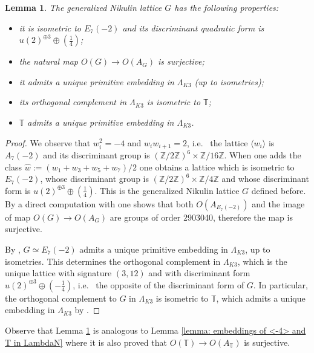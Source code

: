 \documentclass{amsart}
\newtheorem{lem}[thm]{Lemma}
\theoremstyle{definition}
\numberwithin{equation}{section}
\numberwithin{equation}{section} \theoremstyle{definition}
\newcommand{\ra}{\rightarrow}
\newcommand\Z{\mathbb{Z}}
\begin{document}
\begin{lem}\label{lemma: properties of G}
The generalized Nikulin lattice $G$ has the following properties: 
\begin{itemize}
\item it is isometric to $E_7(-2)$ and its discriminant quadratic form is $u(2)^{\oplus 3}\oplus \left(\frac{1}{4}\right)$;
\item the natural map $O(G)\ra O(A_G)$ is surjective; 
\item  it admits a unique primitive embedding in $\Lambda_{K3}$ (up to isometries); \item its orthogonal complement in $\Lambda_{K3}$ is isometric to $\mathbb{T}$;
\item $\mathbb{T}$ admits a unique primitive embedding in $\Lambda_{K3}$.
\end{itemize}
\end{lem}
\begin{proof}
We observe that $w_i^2=-4$ and $w_{i}w_{i+1}=2$, i.e.~ the lattice $\langle w_i\rangle$ is $A_7(-2)$ and its discriminant group is $(\Z/2\Z)^6\times \Z/16\Z$. When one adds the class $\hat{w}:=(w_1+w_3+w_5+w_7)/2$ one obtains a lattice which is isometric to $E_7(-2)$, whose discriminant group is $(\Z/2\Z)^6\times \Z/4\Z$ and whose discriminant form is $u(2)^{\oplus 3}\oplus (\frac{1}{4})$. This is the generalized Nikulin lattice $G$ defined before. By a direct computation with \cite{oscar} one shows that both $O(A_{E_7(-2)})$ and the image of map $O(G)\ra O(A_G)$ are groups of order 2903040, therefore the map is surjective.

By \cite[Theorem 1.14.4]{N}, $G\simeq E_7(-2)$ admits a unique primitive embedding in $\Lambda_{K3}$, up to isometries. This determines the orthogonal complement in $\Lambda_{K3}$, which is the unique lattice with signature $(3,12)$ and with discriminant form  $u(2)^{\oplus 3}\oplus (-\frac{1}{4})$, i.e.~ the opposite of the discriminant form of $G$. In particular, the orthogonal complement to $G$ in $\Lambda_{K3}$ is isometric to $\mathbb{T}$, which admits a unique embedding in $\Lambda_{K3}$ by \cite[Theorem 1.14.4]{N}.
\end{proof}
Observe that Lemma \ref{lemma: properties of G} is analogous to Lemma \ref{lemma: embeddings of <-4> and T in LambdaN} where it is also proved that $O(\mathbb{T})\ra O(A_{\mathbb{T}})$ is surjective.
\end{document}
